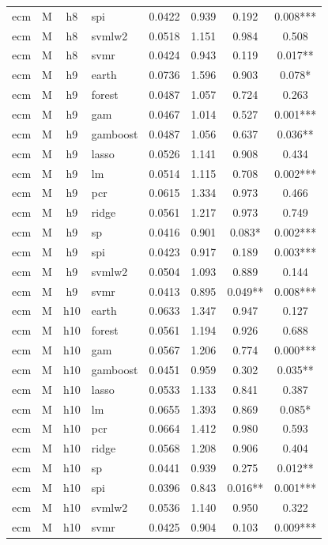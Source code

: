 \begin{ThreePartTable}
\begin{longtable}[t]{llclcccc}
ecm & M & h8 & spi & 0.0422 & 0.939 & 0.192 & 0.008***\\
ecm & M & h8 & svmlw2 & 0.0518 & 1.151 & 0.984 & 0.508\\
ecm & M & h8 & svmr & 0.0424 & 0.943 & 0.119 & 0.017**\\
\addlinespace
ecm & M & h9 & earth & 0.0736 & 1.596 & 0.903 & 0.078*\\
ecm & M & h9 & forest & 0.0487 & 1.057 & 0.724 & 0.263\\
ecm & M & h9 & gam & 0.0467 & 1.014 & 0.527 & 0.001***\\
ecm & M & h9 & gamboost & 0.0487 & 1.056 & 0.637 & 0.036**\\
ecm & M & h9 & lasso & 0.0526 & 1.141 & 0.908 & 0.434\\
ecm & M & h9 & lm & 0.0514 & 1.115 & 0.708 & 0.002***\\
ecm & M & h9 & pcr & 0.0615 & 1.334 & 0.973 & 0.466\\
ecm & M & h9 & ridge & 0.0561 & 1.217 & 0.973 & 0.749\\
ecm & M & h9 & sp & 0.0416 & 0.901 & 0.083* & 0.002***\\
ecm & M & h9 & spi & 0.0423 & 0.917 & 0.189 & 0.003***\\
ecm & M & h9 & svmlw2 & 0.0504 & 1.093 & 0.889 & 0.144\\
ecm & M & h9 & svmr & 0.0413 & 0.895 & 0.049** & 0.008***\\
\addlinespace
ecm & M & h10 & earth & 0.0633 & 1.347 & 0.947 & 0.127\\
ecm & M & h10 & forest & 0.0561 & 1.194 & 0.926 & 0.688\\
ecm & M & h10 & gam & 0.0567 & 1.206 & 0.774 & 0.000***\\
ecm & M & h10 & gamboost & 0.0451 & 0.959 & 0.302 & 0.035**\\
ecm & M & h10 & lasso & 0.0533 & 1.133 & 0.841 & 0.387\\
ecm & M & h10 & lm & 0.0655 & 1.393 & 0.869 & 0.085*\\
ecm & M & h10 & pcr & 0.0664 & 1.412 & 0.980 & 0.593\\
ecm & M & h10 & ridge & 0.0568 & 1.208 & 0.906 & 0.404\\
ecm & M & h10 & sp & 0.0441 & 0.939 & 0.275 & 0.012**\\
ecm & M & h10 & spi & 0.0396 & 0.843 & 0.016** & 0.001***\\
ecm & M & h10 & svmlw2 & 0.0536 & 1.140 & 0.950 & 0.322\\
ecm & M & h10 & svmr & 0.0425 & 0.904 & 0.103 & 0.009***\\

\end{longtable}
\end{ThreePartTable}
